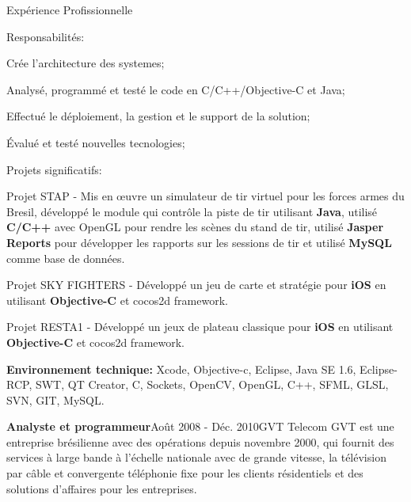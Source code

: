 \documentclass{resume}
\begin{document}
\begin{rSection}{Expérience Profissionnelle}
      \begin{rSubsection}{\fontsize{9}{10}\selectfont Responsabilités:}{}{}{}
        \item Crée l’architecture des systemes;
        \item Analysé, programmé et testé le code en C/C++/Objective-C et Java;
        \item Effectué le déploiement, la gestion et le support de la solution;
        \item Évalué et testé nouvelles tecnologies;
      \end{rSubsection}

      \begin{rSubsection}{\fontsize{9}{10}\selectfont Projets significatifs:}{}{}{}
        \item Projet STAP - Mis en œuvre un simulateur de tir virtuel pour les forces armes du Bresil, développé le module qui contrôle la piste de tir utilisant \textbf{Java}, utilisé \textbf{C/C++} avec OpenGL pour rendre les scènes du stand de tir, utilisé \textbf{Jasper Reports} pour développer les rapports sur les sessions de tir et utilisé \textbf{MySQL} comme base de données.
        \item Projet SKY FIGHTERS - Développé un jeu de carte et stratégie pour \textbf{iOS} en utilisant \textbf{Objective-C} et cocos2d framework.
        \item Projet RESTA1 - Développé un jeux de plateau classique pour \textbf{iOS} en utilisant \textbf{Objective-C} et cocos2d framework.
      \end{rSubsection}

      {\fontsize{8}{9}\selectfont \textbf{Environnement technique:} Xcode, Objective-c, Eclipse, Java SE 1.6, Eclipse-RCP, SWT, QT Creator, C, Sockets, OpenCV, OpenGL, C++, SFML, GLSL, SVN, GIT, MySQL.}\\
    

    \begin{rSubsection}{\fontsize{12}{14}\selectfont \bf Analyste et programmeur}{\fontsize{12}{14}\selectfont Août 2008 - Déc. 2010}{\fontsize{12}{14}\selectfont GVT Telecom}{}
      GVT est une entreprise brésilienne avec des opérations depuis novembre 2000, qui fournit des services à large bande à l'échelle nationale avec de grande vitesse, la télévision par câble et convergente téléphonie fixe pour les clients résidentiels et des solutions d'affaires pour les entreprises.\\\\


\end{rSubsection}
\end{rSection}
\end{document}
